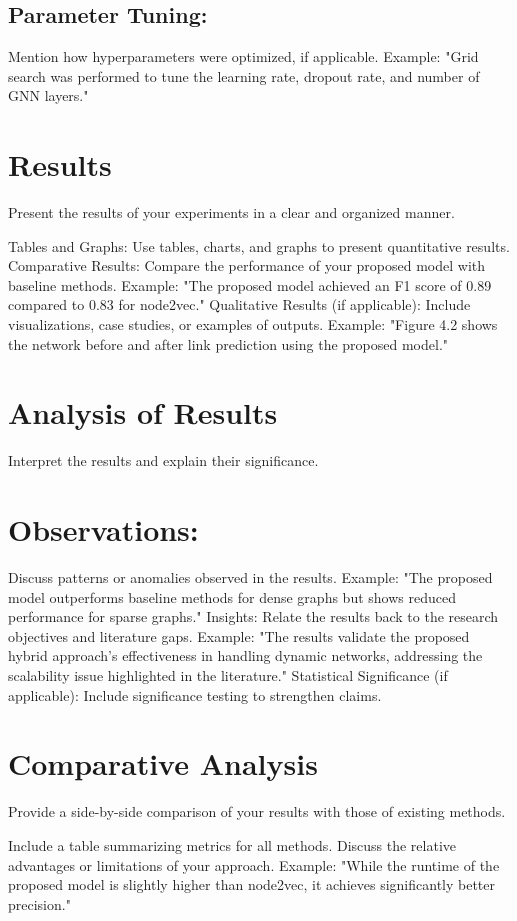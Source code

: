 \subsection{Parameter Tuning:} Mention how hyperparameters were optimized, if applicable.
Example: "Grid search was performed to tune the learning rate, dropout rate, and number of GNN layers."
\section{Results} Present the results of your experiments in a clear and organized manner.

Tables and Graphs: Use tables, charts, and graphs to present quantitative results.
Comparative Results: Compare the performance of your proposed model with baseline methods.
Example: "The proposed model achieved an F1 score of 0.89 compared to 0.83 for node2vec."
Qualitative Results (if applicable): Include visualizations, case studies, or examples of outputs.
Example: "Figure 4.2 shows the network before and after link prediction using the proposed model."
\section{ Analysis of Results}
 Interpret the results and explain their significance.

\section{Observations:} Discuss patterns or anomalies observed in the results.
Example: "The proposed model outperforms baseline methods for dense graphs but shows reduced performance for sparse graphs."
Insights: Relate the results back to the research objectives and literature gaps.
Example: "The results validate the proposed hybrid approach's effectiveness in handling dynamic networks, addressing the scalability issue highlighted in the literature."
Statistical Significance (if applicable): Include significance testing to strengthen claims.
\section{ Comparative Analysis}
 Provide a side-by-side comparison of your results with those of existing methods.

Include a table summarizing metrics for all methods.
Discuss the relative advantages or limitations of your approach.
Example: "While the runtime of the proposed model is slightly higher than node2vec, it achieves significantly better precision."